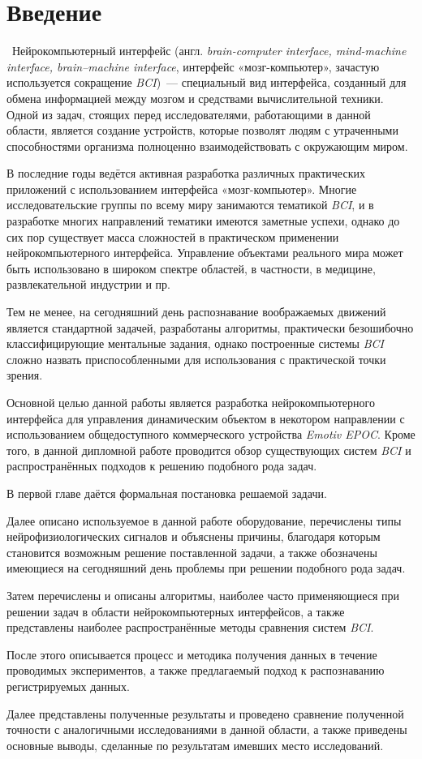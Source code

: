 \documentclass[12pt,a4paper,oneside,fleqn,leqno]{article}
\begin{document}
\section{Введение}
	\quad\,\,\,Нейрокомпьютерный интерфейс (англ. {\it brain-computer interface, mind-machine interface, brain–machine interface}, интерфейс «мозг-компьютер», зачастую используется сокращение {\it BCI})~--- специальный вид интерфейса, созданный для обмена информацией между мозгом и средствами вычислительной техники. Одной из задач, стоящих перед исследователями, работающими в данной области, является создание устройств, которые позволят людям с утраченными способностями организма полноценно взаимодействовать с окружающим миром.
	\par В последние годы ведётся активная разработка различных практических приложений с использованием интерфейса «мозг-компьютер». Многие исследовательские группы по всему миру занимаются тематикой {\it BCI}, и в разработке многих направлений тематики имеются заметные успехи, однако до сих пор существует масса сложностей в практическом применении нейрокомпьютерного интерфейса. Управление объектами реального мира может быть использовано в широком спектре областей, в частности, в медицине, развлекательной индустрии и пр.
	\par Тем не менее, на сегодняшний день распознавание воображаемых движений является стандартной задачей, разработаны алгоритмы, практически безошибочно классифицирующие ментальные задания, однако построенные системы {\it BCI} сложно назвать приспособленными для использования с практической точки зрения.
	\par Основной целью данной работы является разработка нейрокомпьютерного интерфейса для управления динамическим объектом в некотором направлении с использованием общедоступного коммерческого устройства {\it Emotiv EPOC}. Кроме того, в данной дипломной работе проводится обзор существующих систем {\it BCI} и распространённых подходов к решению подобного рода задач.
	\par В первой главе даётся формальная постановка решаемой задачи.
	\par Далее описано используемое в данной работе оборудование, перечислены типы нейрофизиологических сигналов и объяснены причины, благодаря которым становится возможным решение поставленной задачи, а также обозначены имеющиеся на сегодняшний день проблемы при решении подобного рода задач.
	\par Затем перечислены и описаны алгоритмы, наиболее часто применяющиеся при решении задач в области нейрокомпьютерных интерфейсов, а также представлены наиболее распространённые методы сравнения систем {\it BCI}.
	\par После этого описывается процесс и методика получения данных в течение проводимых экспериментов, а также предлагаемый подход к распознаванию регистрируемых данных.
	\par Далее представлены полученные результаты и проведено сравнение полученной точности с аналогичными исследованиями в данной области, а также приведены основные выводы, сделанные по результатам имевших место исследований.
\end{document}

